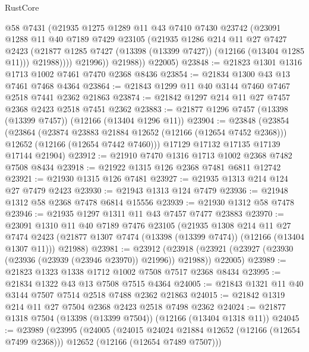 \begin{lexlean}{RustCore}
\begin{coremodule}
                @58
                @7431
                (@21935
                  @1275
                  @1289
                  @11
                  @43
                  @7410
                  @7430
                  @23742
                  (@23091
                    @1288
                    @11
                    @40
                    @7189
                    @7429
                    @23105
                    (@21935
                      @1286
                      @214
                      @11
                      @27
                      @7427
                      @2423
                      (@21877 @1285 @7427 (@13398 (@13399 @7427)) (@12166 (@13404 @1285 @11)))
                      @21988))))
              @21996))
          @21988))
      @22005)
@23848 := @21823 @1301 @1316 @1713 @1002 @7461 @7470 @2368 @8436
@23854 := @21834 @1300 @43 @13 @7461 @7468 @4364
@23864 := @21843 @1299 @11 @40 @3144 @7460 @7467 @2518 @7441 @2362 @21863
@23874 := @21842 @1297 @214 @11 @27 @7457 @2368 @2423 @2518 @7451 @2362
@23883 := @21877 @1296 @7457 (@13398 (@13399 @7457)) (@12166 (@13404 @1296 @11))
@23904 := @23848
    (@23854
      (@23864
        (@23874 @23883 @21884 @12652 (@12166 (@12654 @7452 @2368)))
        @12652
        (@12166 (@12654 @7442 @7460)))
      @17129
      @17132
      @17135
      @17139
      @17144
      @21904)
@23912 := @21910 @7470 @1316 @1713 @1002 @2368 @7482 @7508 @8434
@23918 := @21922 @1315 @126 @2368 @7481 @6811 @12742
@23921 := @21930 @1315 @126 @7481
@23927 := @21935 @1313 @214 @124 @27 @7479 @2423
@23930 := @21943 @1313 @124 @7479
@23936 := @21948 @1312 @58 @2368 @7478 @6814 @15556
@23939 := @21930 @1312 @58 @7478
@23946 := @21935 @1297 @1311 @11 @43 @7457 @7477 @23883
@23970 := @23091
    @1310
    @11
    @40
    @7189
    @7476
    @23105
    (@21935
      @1308
      @214
      @11
      @27
      @7474
      @2423
      (@21877 @1307 @7474 (@13398 (@13399 @7474)) (@12166 (@13404 @1307 @11)))
      @21988)
@23981 := @23912
    (@23918 (@23921 (@23927 (@23930 (@23936 (@23939 (@23946 @23970)) @21996)) @21988)) @22005)
@23989 := @21823 @1323 @1338 @1712 @1002 @7508 @7517 @2368 @8434
@23995 := @21834 @1322 @43 @13 @7508 @7515 @4364
@24005 := @21843 @1321 @11 @40 @3144 @7507 @7514 @2518 @7488 @2362 @21863
@24015 := @21842 @1319 @214 @11 @27 @7504 @2368 @2423 @2518 @7498 @2362
@24024 := @21877 @1318 @7504 (@13398 (@13399 @7504)) (@12166 (@13404 @1318 @11))
@24045 := @23989
    (@23995
      (@24005
        (@24015 @24024 @21884 @12652 (@12166 (@12654 @7499 @2368)))
        @12652
        (@12166 (@12654 @7489 @7507)))

\end{coremodule}
\end{lexlean}
